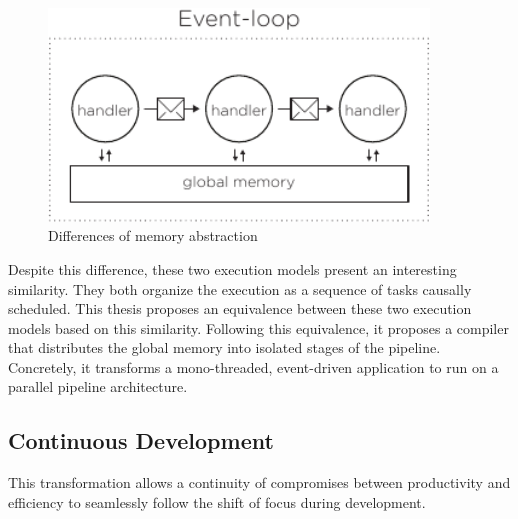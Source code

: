 \begin{figure}[h!]
\begin{center}
\includegraphics[width=0.9\textwidth]{../resources/models-difference.pdf}
\end{center}
\caption{Differences of memory abstraction}
\label{fig:difference}
\end{figure}


Despite this difference, these two execution models present an interesting similarity.
They both organize the execution as a sequence of tasks causally scheduled. %
This thesis proposes an equivalence between these two execution models based on this similarity.
Following this equivalence, it proposes a compiler that distributes the global memory into isolated stages of the pipeline.
Concretely, it transforms a mono-threaded, event-driven application to run on a parallel pipeline architecture.

\subsection{Continuous Development}

This transformation allows a continuity of compromises between productivity and efficiency to seamlessly follow the shift of focus during development.

